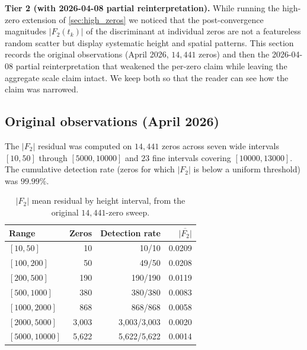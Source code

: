 \documentclass[11pt, a4paper]{article}
\theoremstyle{definition}
\theoremstyle{plain}
\begin{document}
\noindent\textbf{Tier 2 (with 2026-04-08 partial reinterpretation).}
While running the high-zero extension of \cref{sec:high_zeros} we
noticed that the post-convergence magnitudes
$|F_2(t_k)|$ of the discriminant at individual zeros are not a
featureless random scatter but display systematic height and
spatial patterns. This section records the original observations
(April 2026, $14{,}441$ zeros) and then the 2026-04-08 partial
reinterpretation that weakened the per-zero claim while leaving the
aggregate scale claim intact. We keep both so that the reader can
see how the claim was narrowed.

\subsection{Original observations (April 2026)}
\label{sec:f2_residual_original}

The $|F_2|$ residual was computed on $14{,}441$ zeros across seven
wide intervals $[10,50]$ through $[5000,10000]$ and $23$ fine
intervals covering $[10000,13000]$. The cumulative detection rate
(zeros for which $|F_2|$ is below a uniform threshold) was
$99.99\%$.

\begin{table}[ht]
\centering
\caption{$|F_2|$ mean residual by height interval,
  from the original $14{,}441$-zero sweep.}
\label{tab:f2_scale}
\small
\begin{tabular}{lrrr}
\toprule
\textbf{Range} & \textbf{Zeros} & \textbf{Detection rate}
  & $\overline{|F_2|}$ \\
\midrule
$[10, 50]$       & 10     & 10/10     & 0.0209 \\
$[100, 200]$     & 50     & 49/50     & 0.0208 \\
$[200, 500]$     & 190    & 190/190   & 0.0119 \\
$[500, 1000]$    & 380    & 380/380   & 0.0083 \\
$[1000, 2000]$   & 868    & 868/868   & 0.0058 \\
$[2000, 5000]$   & 3{,}003  & 3{,}003/3{,}003 & 0.0020 \\
$[5000, 10000]$  & 5{,}622  & 5{,}622/5{,}622 & 0.0014 \\
\bottomrule
\end{tabular}
\end{table}
\end{document}
